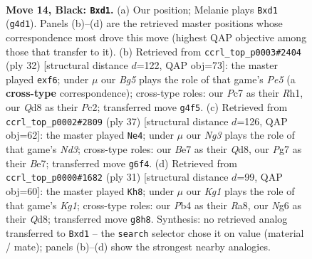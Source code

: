 \documentclass[11pt]{article}
\begin{document}
\clearpage

\begin{figure}[p]\centering
\begin{subfigure}{0.46\textwidth}\centering
\resizebox{\linewidth}{!}{%
\newchessgame
\chessboard[
  setfen={r2q1rk1/2p1bppp/p1Np1nn1/7P/1pP1PPb1/1B6/PP4P1/RNBQR1K1 b - - 2 14},
  showmover=false,
  pgfstyle=straightmove, color=movearrow, markmove={g4-d1}
]}
\caption{}
\end{subfigure}\hfill
\begin{subfigure}{0.46\textwidth}\centering
\resizebox{\linewidth}{!}{%
\newchessgame
\chessboard[
  setfen={r3kb1r/1bq2pp1/pp2pn2/4P1BP/Pn1p4/1NNB4/1PP1QP2/2KR3R w kq - 0 17},
  showmover=false,
  pgfstyle=straightmove, color=movearrow, markmove={e5-f6}
]}
\caption{}
\end{subfigure}
\\[4pt]
\begin{subfigure}{0.46\textwidth}\centering
\resizebox{\linewidth}{!}{%
\newchessgame
\chessboard[
  setfen={r2q1rk1/3nbppb/2pnp3/1p2P1P1/p7/P1N2N1Q/1PP3BP/R1B2R1K b - - 0 19},
  showmover=false,
  pgfstyle=straightmove, color=movearrow, markmove={d6-e4}
]}
\caption{}
\end{subfigure}\hfill
\begin{subfigure}{0.46\textwidth}\centering
\resizebox{\linewidth}{!}{%
\newchessgame
\chessboard[
  setfen={r2q1rk1/pp2bpp1/2np1nbp/3Np3/4P1PN/3B3P/PPP2P2/R1BQR1K1 b - - 4 16},
  showmover=false,
  pgfstyle=straightmove, color=movearrow, markmove={g8-h8}
]}
\caption{}
\end{subfigure}
\caption{\textbf{Move 14, Black: \texttt{Bxd1}.} (a) Our position; Melanie plays \texttt{Bxd1} (\texttt{g4d1}). Panels (b)--(d) are the retrieved master positions whose correspondence most drove this move (highest QAP objective among those that transfer to it). (b) Retrieved from \texttt{ccrl\_top\_p0003\#2404} (ply 32) [structural distance $d$=122, QAP obj=73]: the master played \texttt{exf6}; under $\mu$ our \emph{Bg5} plays the role of that game's \emph{Pe5} (a \textbf{cross-type} correspondence); cross-type roles: our \emph{P}c7 as their \emph{R}h1, our \emph{Q}d8 as their \emph{P}c2; transferred move \texttt{g4f5}. (c) Retrieved from \texttt{ccrl\_top\_p0002\#2809} (ply 37) [structural distance $d$=126, QAP obj=62]: the master played \texttt{Ne4}; under $\mu$ our \emph{Ng3} plays the role of that game's \emph{Nd3}; cross-type roles: our \emph{B}e7 as their \emph{Q}d8, our \emph{P}g7 as their \emph{B}e7; transferred move \texttt{g6f4}. (d) Retrieved from \texttt{ccrl\_top\_p0000\#1682} (ply 31) [structural distance $d$=99, QAP obj=60]: the master played \texttt{Kh8}; under $\mu$ our \emph{Kg1} plays the role of that game's \emph{Kg1}; cross-type roles: our \emph{P}b4 as their \emph{R}a8, our \emph{N}g6 as their \emph{Q}d8; transferred move \texttt{g8h8}. Synthesis: no retrieved analog transferred to \texttt{Bxd1} -- the \texttt{search} selector chose it on value (material / mate); panels (b)--(d) show the strongest nearby analogies.}
\label{fig:thought-m27}
\end{figure}
\end{document}
